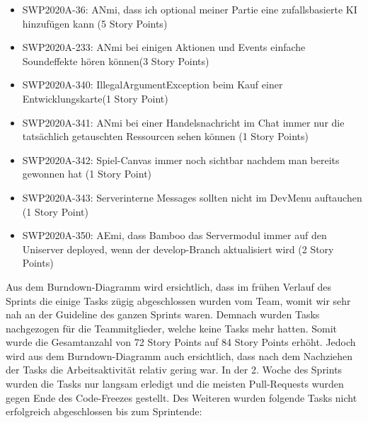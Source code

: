 \documentclass[12pt,a4paper, oneside]{article}
\begin{document}
    \begin{itemize}

        \item SWP2020A-36: ANmi, dass ich optional meiner Partie eine zufallsbasierte KI hinzufügen kann (5 Story Points)

        \item SWP2020A-233: ANmi bei einigen Aktionen und Events einfache Soundeffekte hören können(3 Story Points)

        \item SWP2020A-340: IllegalArgumentException beim Kauf einer Entwicklungskarte(1 Story Point)

        \item SWP2020A-341: ANmi bei einer Handelsnachricht im Chat immer nur die tatsächlich getauschten Ressourcen sehen können (1 Story Points)

        \item SWP2020A-342: Spiel-Canvas immer noch sichtbar nachdem man bereits gewonnen hat (1 Story Point)

        \item SWP2020A-343: Serverinterne Messages sollten nicht im DevMenu auftauchen (1 Story Point)

        \item SWP2020A-350: AEmi, dass Bamboo das Servermodul immer auf den Uniserver deployed, wenn der develop-Branch aktualisiert wird (2 Story Points)

    \end{itemize}

    \newpage
    \noindent
    Aus dem Burndown-Diagramm wird ersichtlich, dass im frühen Verlauf des Sprints die einige Tasks zügig abgeschlossen wurden vom Team, womit wir sehr nah an der Guideline des ganzen Sprints waren. Demnach wurden Tasks nachgezogen für die Teammitglieder, welche keine Tasks mehr hatten.
    Somit wurde die Gesamtanzahl von 72 Story Points auf 84 Story Points erhöht.
    Jedoch wird aus dem Burndown-Diagramm auch ersichtlich, dass nach dem Nachziehen der Tasks die Arbeitsaktivität relativ gering war. In der 2. Woche des Sprints wurden die Tasks nur langsam erledigt und die meisten Pull-Requests wurden gegen Ende des Code-Freezes gestellt. Des Weiteren wurden folgende Tasks nicht erfolgreich abgeschlossen bis zum Sprintende:
\end{document}
